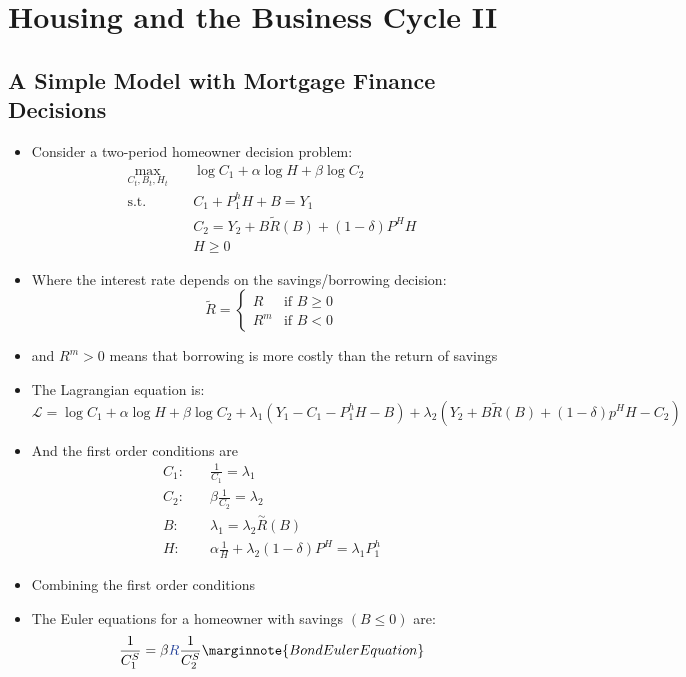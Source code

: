 \documentclass{article}
\numberwithin{equation}{section}
\numberwithin{figure}{section}
\begin{document}
\section{Housing and the Business Cycle II}
\subsection{A Simple Model with Mortgage Finance Decisions}
	\begin{itemize}
		\item Consider a two-period homeowner decision problem:
		\begin{align*}
			\max_{C_t,B_t,H_t}\quad &\log C_1 + \alpha\log H + \beta\log C_2 \\
			\text{s.t.}\quad &C_1 + P_1^h H + B = Y_1\\
			&C_2 = Y_2 + B\tilde{R}(B) + (1-\delta) P^H H\\
			&H \geq 0
		\end{align*}
		\item Where the interest rate depends on the savings/borrowing decision:
		\[
			\tilde{R}=
			\begin{cases}
				R &\text{if } B\geq0 \\
				R^m &\text{if } B<0
			\end{cases}
		\]
		\item and \( R^m > 0 \) means that borrowing is more costly than the return of savings
		\item The Lagrangian equation is:
		\[
			\mathcal{L} = \log C_1 + \alpha\log H + \beta\log C_2 + \lambda_1(Y_1 - C_1 - P_1^h H-B) + \lambda_2(Y_2 + B\tilde{R}(B) + (1-\delta)p^H H-C_2)
		\]
		\item And the first order conditions are
		\begin{align*}
			C_1:& \quad\frac{1}{C_1}=\lambda_1\\
			C_2:& \quad\beta\frac{1}{C_2}=\lambda_2\\
			B:& \quad\lambda_1=\lambda_2\overset{\sim}{R}(B)\\
			H:& \quad\alpha\frac{1}{H}+\lambda_2(1-\delta)P^H = \lambda_1P_1^h
		\end{align*}
		\item Combining the first order conditions
		\item The Euler equations for a homeowner with \textcolor{myblue}{savings} \( (B\leq0) \) are:
		\begin{align*}
			\frac{1}{C_1^S} &= \beta\textcolor{myblue}{R}\frac{1}{C_2^S}\marginnote{Bond Euler Equation}\\

\end{align*}
\end{itemize}
\end{document}
